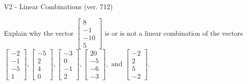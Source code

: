 \begin{exercise}
  \begin{exerciseTitle}V2 - Linear Combinations (ver. 712)\end{exerciseTitle}
  \begin{exerciseStatement}
    Explain why the vector \(\left[\begin{array}{c}
8 \\
-1 \\
-10 \\
5
\end{array}\right]\)  is or is not a linear 
	combination of the vectors \(\left[\begin{array}{c}
-2 \\
-1 \\
-5 \\
1
\end{array}\right] , \left[\begin{array}{c}
-5 \\
2 \\
4 \\
0
\end{array}\right] , \left[\begin{array}{c}
-3 \\
0 \\
-1 \\
2
\end{array}\right] , \left[\begin{array}{c}
20 \\
-5 \\
-6 \\
-3
\end{array}\right] , \text{ and } \left[\begin{array}{c}
-2 \\
2 \\
5 \\
-2
\end{array}\right]\).
	



\end{exerciseStatement}
\end{exercise}
